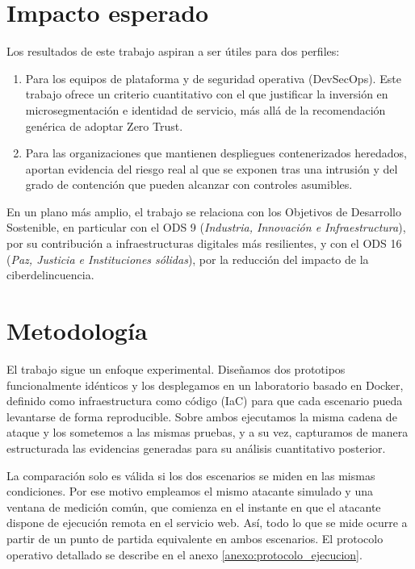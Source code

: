 \documentclass[11pt,spanish,listoffigures,listoftables]{tfgetsinf}
\begin{document}
    \section{Impacto esperado}
    Los resultados de este trabajo aspiran a ser útiles para dos perfiles:
    \begin{enumerate}
        \item Para los equipos de plataforma y de seguridad operativa (DevSecOps). Este trabajo ofrece un criterio cuantitativo con el que justificar la inversión en microsegmentación e identidad de servicio, más allá de la recomendación genérica de adoptar Zero Trust. 
        \item Para las organizaciones que mantienen despliegues contenerizados heredados, aportan evidencia del riesgo real al que se exponen tras una intrusión y del grado de contención que pueden alcanzar con controles asumibles.
    \end{enumerate}
    
    En un plano más amplio, el trabajo se relaciona con los Objetivos de Desarrollo Sostenible, en particular con el ODS 9 (\emph{Industria, Innovación e Infraestructura}), por su contribución a infraestructuras digitales más resilientes, y con el ODS 16 (\emph{Paz, Justicia e Instituciones sólidas}), por la reducción del impacto de la ciberdelincuencia. 
    
    \section{Metodología}
    El trabajo sigue un enfoque experimental. Diseñamos dos prototipos funcionalmente idénticos y los desplegamos en un laboratorio basado en Docker, definido como infraestructura como código (IaC) para que cada escenario pueda levantarse de forma reproducible. Sobre ambos ejecutamos la misma cadena de ataque y los sometemos a las mismas pruebas, y a su vez, capturamos de manera estructurada las evidencias generadas para su análisis cuantitativo posterior.

    La comparación solo es válida si los dos escenarios se miden en las mismas condiciones. Por ese motivo empleamos el mismo atacante simulado y una ventana de medición común, que comienza en el instante en que el atacante dispone de ejecución remota en el servicio web. Así, todo lo que se mide ocurre a partir de un punto de partida equivalente en ambos escenarios. El protocolo operativo detallado se describe en el anexo \ref{anexo:protocolo_ejecucion}.  
    
\end{document}
